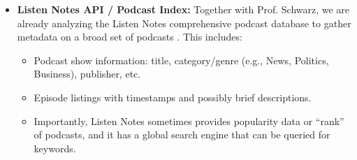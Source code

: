 \documentclass[12pt]{article}
\begin{document}
\begin{itemize}
    \item \textbf{Listen Notes API / Podcast Index:} Together with Prof. Schwarz, we are already analyzing the Listen Notes comprehensive podcast database to gather metadata on a broad set of podcasts \citep{listennotes_datasets}. This includes:
          \begin{itemize}
              \item Podcast show information: title, category/genre (e.g., News, Politics, Business), publisher, etc.
              \item Episode listings with timestamps and possibly brief descriptions.
              \item Importantly, Listen Notes sometimes provides popularity data or ``rank'' of podcasts, and it has a global search engine that can be queried for keywords.
          \end{itemize}


\end{itemize}
\end{document}
